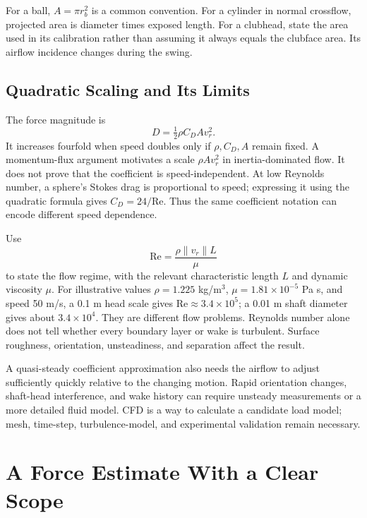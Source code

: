 For a ball, $A=\pi r_b^2$ is a common convention. For a cylinder in normal
crossflow, projected area is diameter times exposed length. For a clubhead,
state the area used in its calibration rather than assuming it always equals
the clubface area. Its airflow incidence changes during the swing.

\subsection{Quadratic Scaling and Its Limits}

The force magnitude is
\begin{equation}
 D=\tfrac12\rho C_D A v_r^2.
 \label{eq:drag-scalar}
\end{equation}
It increases fourfold when speed doubles only if $\rho,C_D,A$ remain fixed.
A momentum-flux argument motivates a scale $\rho Av_r^2$ in inertia-dominated
flow. It does not prove that the coefficient is speed-independent. At low
Reynolds number, a sphere's Stokes drag is proportional to speed; expressing it
using the quadratic formula gives $C_D=24/\mathrm{Re}$. Thus the same coefficient
notation can encode different speed dependence.

Use
\begin{equation}
 \mathrm{Re}=\frac{\rho\|v_r\|L}{\mu}
 \label{eq:drag_reynolds}
\end{equation}
to state the flow regime, with the relevant characteristic length $L$ and
dynamic viscosity $\mu$. For illustrative values $\rho=1.225$ kg/m$^3$,
$\mu=1.81\times10^{-5}$ Pa s, and speed 50 m/s, a 0.1 m head scale gives
$\mathrm{Re}\approx3.4\times10^5$; a 0.01 m shaft diameter gives about
$3.4\times10^4$. They are different flow problems. Reynolds number alone does
not tell whether every boundary layer or wake is turbulent. Surface roughness,
orientation, unsteadiness, and separation affect the result.

A quasi-steady coefficient approximation also needs the airflow to adjust
sufficiently quickly relative to the changing motion. Rapid orientation changes,
shaft-head interference, and wake history can require unsteady measurements or
a more detailed fluid model. CFD is a way to calculate a candidate load model;
mesh, time-step, turbulence-model, and experimental validation remain necessary.

\section{A Force Estimate With a Clear Scope}

